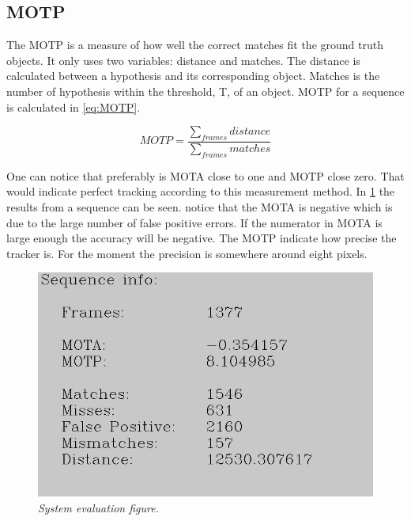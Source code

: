 \subsection{MOTP}
The MOTP is a measure of how well the correct matches fit the ground truth objects. It only uses two variables: distance and matches. The distance is calculated between a hypothesis and its corresponding object. Matches is the number of hypothesis within the 
threshold, T, of an object. MOTP for a sequence is calculated in \eqref{eq:MOTP}.

\begin{equation}
\label{eq:MOTP}
MOTP = \frac{\sum_{frames}{distance}}{\sum_{frames}{matches}}
\end{equation}

One can notice that preferably is MOTA close to one and MOTP close zero. That would indicate perfect tracking according to this measurement method. In \ref{fig:system_evaluation_fig} the results from a sequence can be seen. notice that the MOTA is negative which is due to the large number of false positive errors. If the numerator in MOTA is large enough the accuracy will be negative. The MOTP indicate how precise the tracker is. For the moment the precision is somewhere around eight pixels.

\begin{figure}[htb]
	\centering
	\includegraphics[width=\linewidth]{images/sequenceEvaluation}
	\caption{\textit{System evaluation figure.}}
	\label{fig:system_evaluation_fig} %
\end{figure}



